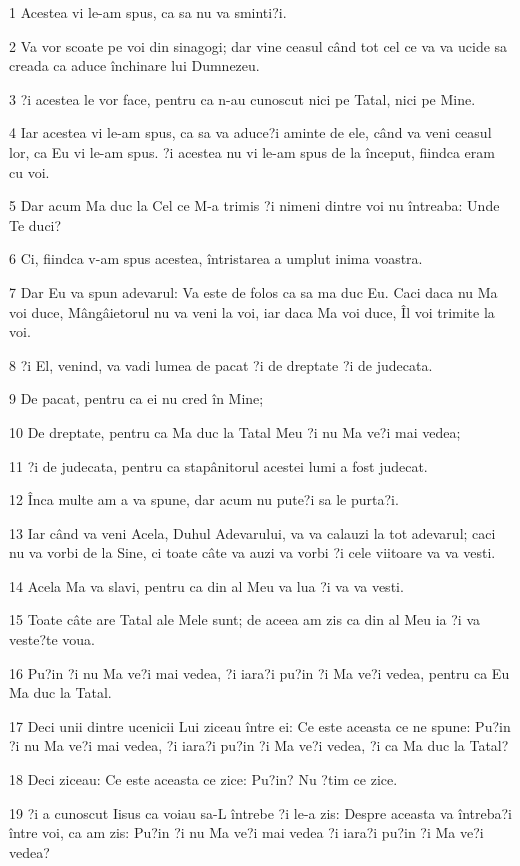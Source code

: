 \par 1 Acestea vi le-am spus, ca sa nu va sminti?i.
\par 2 Va vor scoate pe voi din sinagogi; dar vine ceasul când tot cel ce va va ucide sa creada ca aduce închinare lui Dumnezeu.
\par 3 ?i acestea le vor face, pentru ca n-au cunoscut nici pe Tatal, nici pe Mine.
\par 4 Iar acestea vi le-am spus, ca sa va aduce?i aminte de ele, când va veni ceasul lor, ca Eu vi le-am spus. ?i acestea nu vi le-am spus de la început, fiindca eram cu voi.
\par 5 Dar acum Ma duc la Cel ce M-a trimis ?i nimeni dintre voi nu întreaba: Unde Te duci?
\par 6 Ci, fiindca v-am spus acestea, întristarea a umplut inima voastra.
\par 7 Dar Eu va spun adevarul: Va este de folos ca sa ma duc Eu. Caci daca nu Ma voi duce, Mângâietorul nu va veni la voi, iar daca Ma voi duce, Îl voi trimite la voi.
\par 8 ?i El, venind, va vadi lumea de pacat ?i de dreptate ?i de judecata.
\par 9 De pacat, pentru ca ei nu cred în Mine;
\par 10 De dreptate, pentru ca Ma duc la Tatal Meu ?i nu Ma ve?i mai vedea;
\par 11 ?i de judecata, pentru ca stapânitorul acestei lumi a fost judecat.
\par 12 Înca multe am a va spune, dar acum nu pute?i sa le purta?i.
\par 13 Iar când va veni Acela, Duhul Adevarului, va va calauzi la tot adevarul; caci nu va vorbi de la Sine, ci toate câte va auzi va vorbi ?i cele viitoare va va vesti.
\par 14 Acela Ma va slavi, pentru ca din al Meu va lua ?i va va vesti.
\par 15 Toate câte are Tatal ale Mele sunt; de aceea am zis ca din al Meu ia ?i va veste?te voua.
\par 16 Pu?in ?i nu Ma ve?i mai vedea, ?i iara?i pu?in ?i Ma ve?i vedea, pentru ca Eu Ma duc la Tatal.
\par 17 Deci unii dintre ucenicii Lui ziceau între ei: Ce este aceasta ce ne spune: Pu?in ?i nu Ma ve?i mai vedea, ?i iara?i pu?in ?i Ma ve?i vedea, ?i ca Ma duc la Tatal?
\par 18 Deci ziceau: Ce este aceasta ce zice: Pu?in? Nu ?tim ce zice.
\par 19 ?i a cunoscut Iisus ca voiau sa-L întrebe ?i le-a zis: Despre aceasta va întreba?i între voi, ca am zis: Pu?in ?i nu Ma ve?i mai vedea ?i iara?i pu?in ?i Ma ve?i vedea?
